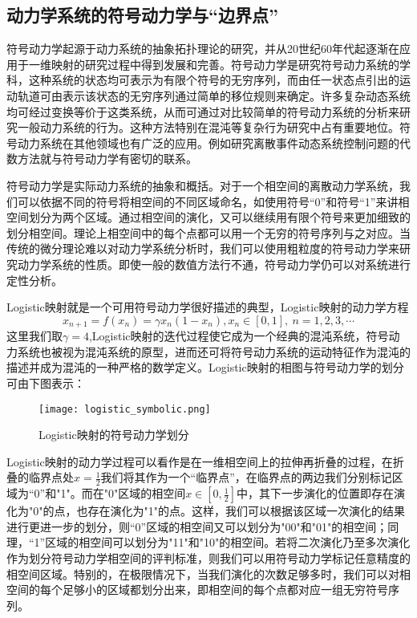 \subsection{动力学系统的符号动力学与“边界点”}

符号动力学起源于动力系统的抽象拓扑理论的研究，并从20世纪60年代起逐渐在应用于一维映射的研究过程中得到发展和完善。符号动力学是研究符号动力系统的学科，这种系统的状态均可表示为有限个符号的无穷序列，而由任一状态点引出的运动轨道可由表示该状态的无穷序列通过简单的移位规则来确定。许多复杂动态系统均可经过变换等价于这类系统，从而可通过对比较简单的符号动力系统的分析来研究一般动力系统的行为。这种方法特别在混沌等复杂行为研究中占有重要地位。符号动力系统在其他领域也有广泛的应用。例如研究离散事件动态系统控制问题的代数方法就与符号动力学有密切的联系。

符号动力学是实际动力系统的抽象和概括。对于一个相空间的离散动力学系统，我们可以依据不同的符号将相空间的不同区域命名，如使用符号“0”和符号“1”来讲相空间划分为两个区域。通过相空间的演化，又可以继续用有限个符号来更加细致的划分相空间。理论上相空间中的每个点都可以用一个无穷的符号序列与之对应。当传统的微分理论难以对动力学系统分析时，我们可以使用粗粒度的符号动力学来研究动力学系统的性质。即使一般的数值方法行不通，符号动力学仍可以对系统进行定性分析。

Logistic映射就是一个可用符号动力学很好描述的典型，Logistic映射的动力学方程
\begin{equation}
    x_{n+1}=f(x_n)=\gamma x_n (1-x_n ),x_n∈[0,1],\ n=1,2,3,\cdots
\end{equation}
这里我们取$\gamma=4$,Logistic映射的迭代过程使它成为一个经典的混沌系统，符号动力系统也被视为混沌系统的原型，进而还可将符号动力系统的运动特征作为混沌的描述并成为混沌的一种严格的数学定义。Logistic映射的相图与符号动力学的划分可由下图表示：
\begin{figure}
	\centering
	\texttt{[image: logistic\_symbolic.png]}
    \caption{Logistic映射的符号动力学划分}
    \label{fig:logi_symb}
\end{figure}
Logistic映射的动力学过程可以看作是在一维相空间上的拉伸再折叠的过程，在折叠的临界点处$x=\frac{1}{2}$我们将其作为一个“临界点”，在临界点的两边我们分别标记区域为“0”和"1"。而在"0"区域的相空间$x\in [0,\frac{1}{2}]$中，其下一步演化的位置即存在演化为"0"的点，也存在演化为"1"的点。这样，我们可以根据该区域一次演化的结果进行更进一步的划分，则“0”区域的相空间又可以划分为"00"和"01"的相空间；同理，“1”区域的相空间可以划分为"11"和"10"的相空间。若将二次演化乃至多次演化作为划分符号动力学相空间的评判标准，则我们可以用符号动力学标记任意精度的相空间区域。特别的，在极限情况下，当我们演化的次数足够多时，我们可以对相空间的每个足够小的区域都划分出来，即相空间的每个点都对应一组无穷符号序列。

